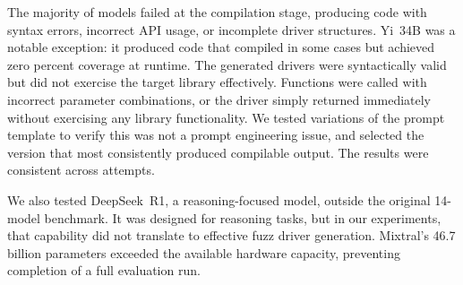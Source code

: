 \begin{table}[htbp]
\centering
\caption{Unsuccessful Models and Failure Analysis on yaml-cpp}
\label{tab:unsuccessful_models}
\end{table}

The majority of models failed at the compilation stage, producing code with syntax errors, incorrect API usage, or incomplete driver structures. Yi~34B was a notable exception: it produced code that compiled in some cases but achieved zero percent coverage at runtime. The generated drivers were syntactically valid but did not exercise the target library effectively. Functions were called with incorrect parameter combinations, or the driver simply returned immediately without exercising any library functionality. We tested variations of the prompt template to verify this was not a prompt engineering issue, and selected the version that most consistently produced compilable output. The results were consistent across attempts.

We also tested DeepSeek~R1, a reasoning-focused model, outside the original 14-model benchmark. It was designed for reasoning tasks, but in our experiments, that capability did not translate to effective fuzz driver generation. Mixtral's 46.7 billion parameters exceeded the available hardware capacity, preventing completion of a full evaluation run.

